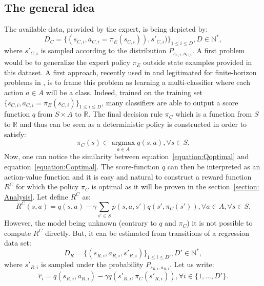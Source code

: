 \documentclass{article} %
\newcommand{\argmax}{\operatorname*{argmax}}
\newcommand{\0}{\mathbf{0}}
\newcommand{\1}{\mathbf{1}}
\begin{document}
\subsection{The general idea}
The available data, provided by the expert, is being depicted by:
\begin{equation}
\label{equation:data}
D_C=\{(s_{C,i},a_{C,i}=\pi_E(s_{C,i})),s'_{C,i})\}_{1\leq i \leq D}, D\in\mathbb{N}^*,
\end{equation}
where $s'_{C,i}$ is sampled according to the distribution $P_{s_{C,i},a_{C,i}}$.
A first problem would be to generalize the expert policy $\pi_E$ outside state examples provided in this dataset. A first approach, recently used in \cite{melo2010learning} and legitimated for finite-horizon problems in \cite{syed2010reduction}, is to frame this problem as learning a multi-classifier where each action $a \in A$ will be a class. Indeed, trained on the training set $\{s_{C,i},a_{C,i}=\pi_E(s_{C,i})\}_{1\leq i \leq D}$, many classifiers are able to output a score function $q$ from $S\times A$ to $\mathbb{R}$. The final decision rule $\pi_C$ which is a function from $S$ to $\mathbb{R}$ and thus can be seen as a deterministic policy is constructed in order to satisfy:
\begin{equation}
\label{equation:Coptimal}
\pi_C(s)\in\argmax_{a\in A}q(s,a),\forall s\in S.
\end{equation}
Now, one can notice the similarity between equation~\eqref{equation:Qoptimal} and equation~\eqref{equation:Coptimal}. The score-function $q$ can then be interpreted as an action-value function and it is easy and natural to construct a reward function $R^C$ for which the policy $\pi_C$ is optimal as it will be proven in the section~\ref{section: Analysis}. Let define $R^C$ as:
\begin{equation}
R^C(s,a)=q(s,a)-\gamma\sum_{s'\in S}p(s,a,s')q(s',\pi_C(s')), \forall a \in A, \forall s\in S.
\end{equation}
However, the model being unknown (contrary to $q$ and $\pi_C$) it is not possible to compute $R^C$ directly. But, it can be estimated from transitions of a regression data set:
\begin{equation}
D_R=\{(s_{R,i},a_{R,i},s'_{R,i})\}_{1\leq i \leq D'}, D'\in\mathbb{N}^*,
\end{equation}
where $s'_{R,i}$ is sampled under the probability $P_{s_{R,i},a_{R,i}}$.
Let us write:
\begin{equation}
\label{ri.def}
\hat{r}_i=q(s_{R,i},a_{R,i})-\gamma q(s'_{R,i},\pi_C(s'_{R,i})), \forall i\in \{1,\dots,D'\}.
\end{equation}
\end{document}
